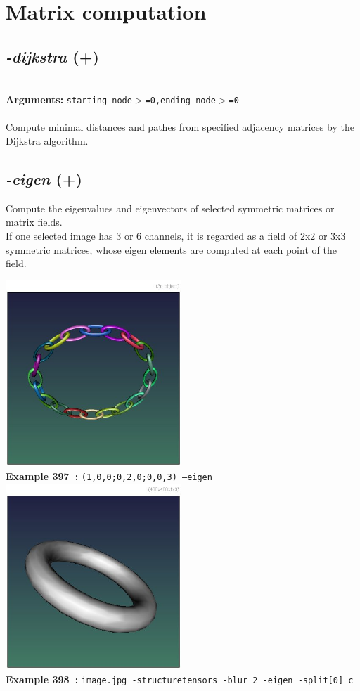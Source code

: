 \documentclass[a4paper,11pt,twoside]{book}
\begin{document}
\section{Matrix computation}


\subsection{\emph{-dijkstra} (+)}\vspace*{-0.5em}
~\\\textbf{Arguments: } 
{\small \texttt{starting\_node$>$=0,ending\_node$>$=0}}\\~\\
Compute minimal distances and pathes from specified adjacency matrices by the Dijkstra algorithm.


\subsection{\emph{-eigen} (+)}\vspace*{-0.5em}
Compute the eigenvalues and eigenvectors of selected symmetric matrices or matrix fields.
~\\If one selected image has 3 or 6 channels, it is regarded as a field of 2x2 or 3x3 symmetric matrices,
whose eigen elements are computed at each point of the field.
\begin{center}\includegraphics[keepaspectratio=true,height=7cm,width=\textwidth]{img/gmic_def397.jpg}\\
{\footnotesize \textbf{Example 397~:} \texttt{(1,0,0;0,2,0;0,0,3) --eigen}}
\\\includegraphics[keepaspectratio=true,height=7cm,width=\textwidth]{img/gmic_def398.jpg}\\
{\footnotesize \textbf{Example 398~:} \texttt{image.jpg -structuretensors -blur 2 -eigen -split[0] c}}
\end{center}
\end{document}
